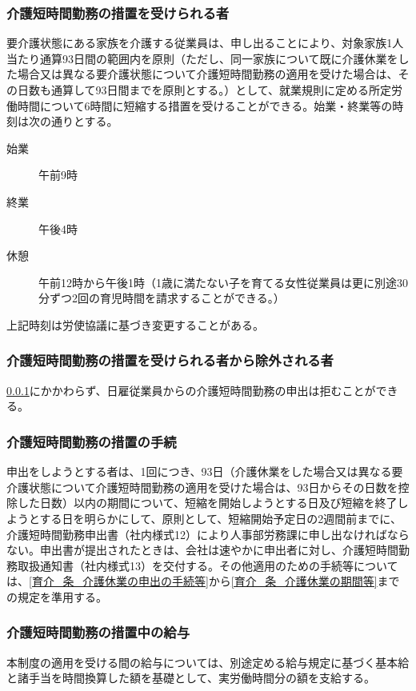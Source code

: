\documentclass{jsarticle}
\begin{document}
\subsubsection{介護短時間勤務の措置を受けられる者}
\label{育介_項_介護短時間勤務の措置を受けられる者}
要介護状態にある家族を介護する従業員は、申し出ることにより、対象家族1人当たり通算93日間の範囲内を原則（ただし、同一家族について既に介護休業をした場合又は異なる要介護状態について介護短時間勤務の適用を受けた場合は、その日数も通算して93日間までを原則とする。）として、就業規則に定める所定労働時間について6時間に短縮する措置を受けることができる。始業・終業等の時刻は次の通りとする。
\begin{description}
  \item[始業]午前9時
  \item[終業]午後4時
  \item[休憩]午前12時から午後1時（1歳に満たない子を育てる女性従業員は更に別途30分ずつ2回の育児時間を請求することができる。）
\end{description}
上記時刻は労使協議に基づき変更することがある。

\subsubsection{介護短時間勤務の措置を受けられる者から除外される者}
\label{育介_項_介護短時間勤務の措置を受けられる者から除外される者}
\ref{育介_項_介護短時間勤務の措置を受けられる者}にかかわらず、日雇従業員からの介護短時間勤務の申出は拒むことができる。

\subsubsection{介護短時間勤務の措置の手続}
\label{育介_項_介護短時間勤務の措置の手続}
申出をしようとする者は、1回につき、93日（介護休業をした場合又は異なる要介護状態について介護短時間勤務の適用を受けた場合は、93日からその日数を控除した日数）以内の期間について、短縮を開始しようとする日及び短縮を終了しようとする日を明らかにして、原則として、短縮開始予定日の2週間前までに、介護短時間勤務申出書（社内様式12）により人事部労務課に申し出なければならない。申出書が提出されたときは、会社は速やかに申出者に対し、介護短時間勤務取扱通知書（社内様式13）を交付する。その他適用のための手続等については、\ref{育介_条_介護休業の申出の手続等}から\ref{育介_条_介護休業の期間等}までの規定を準用する。

\subsubsection{介護短時間勤務の措置中の給与}
\label{育介_項_介護短時間勤務の措置中の給与}
本制度の適用を受ける間の給与については、別途定める給与規定に基づく基本給と諸手当を時間換算した額を基礎として、実労働時間分の額を支給する。
\end{document}
